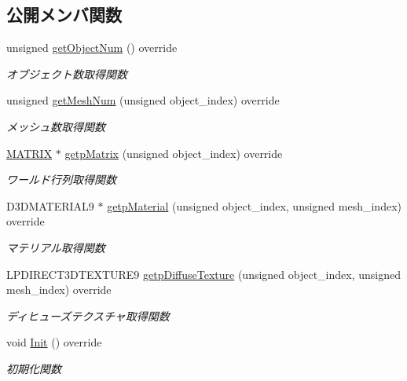 \subsection*{公開メンバ関数}
\begin{DoxyCompactItemize}
\item 
unsigned \mbox{\hyperlink{class_pause_draw_a44936b777c942619b85106d7aa4dda14}{get\+Object\+Num}} () override
\begin{DoxyCompactList}\small\item\em オブジェクト数取得関数 \end{DoxyCompactList}\item 
unsigned \mbox{\hyperlink{class_pause_draw_ab6de445e905a481df0292de7fb1880fc}{get\+Mesh\+Num}} (unsigned object\+\_\+index) override
\begin{DoxyCompactList}\small\item\em メッシュ数取得関数 \end{DoxyCompactList}\item 
\mbox{\hyperlink{_matrix_8h_a032295cd9fb1b711757c90667278e744}{M\+A\+T\+R\+IX}} $\ast$ \mbox{\hyperlink{class_pause_draw_a36622378926e01e7a401b6e201cb4f16}{getp\+Matrix}} (unsigned object\+\_\+index) override
\begin{DoxyCompactList}\small\item\em ワールド行列取得関数 \end{DoxyCompactList}\item 
D3\+D\+M\+A\+T\+E\+R\+I\+A\+L9 $\ast$ \mbox{\hyperlink{class_pause_draw_afa2566700e81ce898e874ce71a8943d5}{getp\+Material}} (unsigned object\+\_\+index, unsigned mesh\+\_\+index) override
\begin{DoxyCompactList}\small\item\em マテリアル取得関数 \end{DoxyCompactList}\item 
L\+P\+D\+I\+R\+E\+C\+T3\+D\+T\+E\+X\+T\+U\+R\+E9 \mbox{\hyperlink{class_pause_draw_a191f46de3bb829ab30fca52f902c1df9}{getp\+Diffuse\+Texture}} (unsigned object\+\_\+index, unsigned mesh\+\_\+index) override
\begin{DoxyCompactList}\small\item\em ディヒューズテクスチャ取得関数 \end{DoxyCompactList}\item 
void \mbox{\hyperlink{class_pause_draw_a6d2ea46c8c17f33684b3eaa42913204b}{Init}} () override
\begin{DoxyCompactList}\small\item\em 初期化関数 \end{DoxyCompactList}\item 

\end{DoxyCompactItemize}
